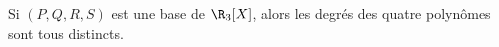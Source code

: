 Si $(P,Q,R,S)$ est une base de $\R_3[X]$, alors les degrés des quatre polynômes sont tous distincts.

\begin{reponses}
\end{reponses}

